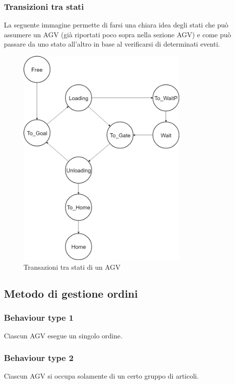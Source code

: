 \documentclass[12pt]{article}
\begin{document}
\subsubsection{Transizioni tra stati}
La seguente immagine permette di farsi una chiara idea degli stati che può assumere un AGV (già riportati poco sopra nella sezione AGV) e come può passare da uno stato all'altro in base al verificarsi di determinati eventi.
\begin{figure}[ht]
\centering
\includegraphics[width=0.75\textwidth,keepaspectratio]{Figures/Graphics/State_Transaction.png}
\caption[Transazioni tra stati di un AGV]{Transazioni tra stati di un AGV}
\label{fig:agv_states}
\end{figure}

\newpage

\subsection{Metodo di gestione ordini}
\subsubsection{Behaviour type 1}
Ciascun AGV esegue un singolo ordine.
\subsubsection{Behaviour type 2}
Ciascun AGV si occupa solamente di un certo gruppo di articoli.
\end{document}

